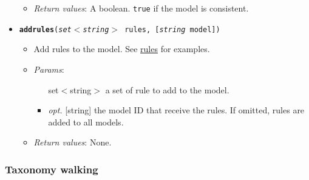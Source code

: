 \begin{itemize}
\begin{itemize}
\item  \emph{Return values}: A boolean. \texttt{true} if the model is consistent.
\end{itemize}

\item  \texttt{\textbf{addrules}(\emph{set$<$string$>$} rules, [\emph{string} model])}
\begin{itemize}
\item  Add rules to the model. See \hyperref[a4f86f7bfc24194b276c22e0ef158197]{rules} for examples.
\item  \emph{Params}:
\begin{itemize}
\item  [set$<$string$>$] a set of rule to add to the model.
\item  \emph{opt.} [string] the model ID that receive the rules. If omitted, rules are added to all models. 
\end{itemize}

\item  \emph{Return values}: None.
\end{itemize}

\end{itemize}

\subsubsection{Taxonomy walking}



